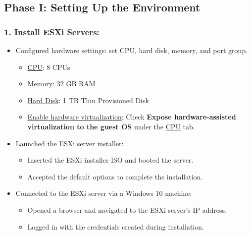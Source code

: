 \documentclass[letterpaper,12pt]{article}
\begin{document}
\subsection{Phase I: Setting Up the Environment}
\label{sec:org8744173}
\subsubsection{1. Install ESXi Servers:}
\label{sec:org7399bb3}
\begin{itemize}
\item Configured hardware settings: set CPU, hard disk, memory, and port group.
\begin{itemize}
\item \uline{CPU}: 8 CPUs
\item \uline{Memory}: 32 GB RAM
\item \uline{Hard Disk}: 1 TB Thin Provisioned Disk
\item \uline{Enable hardware virtualization}: Check \textbf{Expose hardware-assisted virtualization to the guest OS} under the \uline{CPU} tab.
\end{itemize}
\item Launched the ESXi server installer:
\begin{itemize}
\item Inserted the ESXi installer ISO and booted the server.
\item Accepted the default options to complete the installation.
\end{itemize}
\item Connected to the ESXi server via a Windows 10 machine:
\begin{itemize}
\item Opened a browser and navigated to the ESXi server's IP address.
\item Logged in with the credentials created during installation.
\end{itemize}
\end{itemize}
\end{document}
